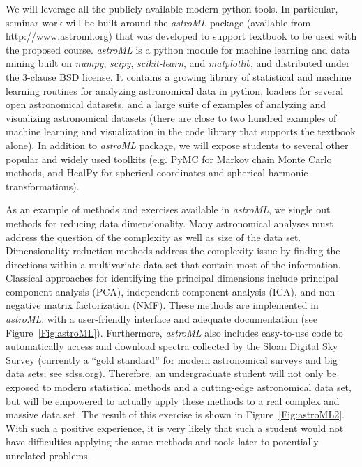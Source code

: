 We will leverage all the publicly available modern python tools. In particular, seminar work will be 
built around the {\it astroML} package (available from http://www.astroml.org) that was developed 
to support textbook to be used with the proposed \astrocl course. {\it astroML} is a python module 
for machine learning and data mining built on {\it numpy}, {\it scipy}, {\it scikit-learn}, and {\it matplotlib}, 
and distributed under the 3-clause BSD license. It contains a growing library of statistical and machine 
learning routines for analyzing astronomical data in python, loaders for several open astronomical datasets, 
and a large suite of examples of analyzing and visualizing astronomical datasets (there are close to two 
hundred examples of machine learning and visualization in the code library that supports the textbook 
alone). In addition to  {\it astroML} package, we will expose students to several other popular and widely
used toolkits (e.g. PyMC for Markov chain Monte Carlo methods, and HealPy for spherical coordinates 
and spherical harmonic transformations). 

As an example of methods and exercises available in  {\it astroML}, we single out methods 
for reducing data dimensionality. Many astronomical analyses must address the question of the 
complexity as well as size of the data set. Dimensionality reduction methods address the
complexity issue  by finding the directions within a multivariate data set that contain most 
of the information. Classical approaches for identifying the principal dimensions include
principal component analysis (PCA), independent component analysis (ICA), and non-negative 
matrix factorization (NMF). These methods are implemented in   {\it astroML}, with a user-friendly 
interface and adequate documentation (see Figure~\ref{Fig:astroML}). Furthermore, {\it astroML} also 
includes easy-to-use code to automatically access and download spectra collected by the Sloan Digital 
Sky Survey (currently a ``gold standard'' for modern astronomical surveys and big data sets; see sdss.org). 
Therefore, an undergraduate student will not only be exposed to modern statistical methods
and a cutting-edge astronomical data set, but will be empowered to actually apply these methods 
to a real complex and massive data set.  The result of this exercise is shown in Figure~\ref{Fig:astroML2}. 
With such a positive experience, it is very likely that such a student would not have difficulties applying 
the same methods and tools later to potentially unrelated problems.  


